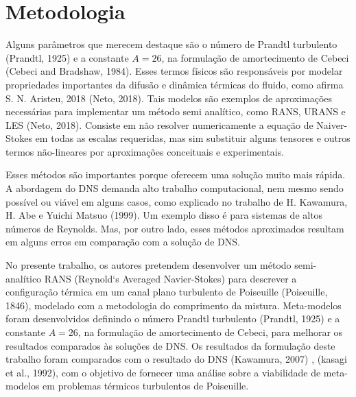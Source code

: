	
\newpage
	

 \section{Metodologia}
 Alguns parâmetros que merecem destaque são o número de Prandtl turbulento (Prandtl, 1925) e a constante $ A = 26 $, na formulação de amortecimento de Cebeci (Cebeci and Bradshaw, 1984). Esses termos físicos são responsáveis por modelar propriedades importantes da difusão e dinâmica térmicas do fluido, como afirma S. N. Aristeu, 2018 (Neto, 2018). Tais modelos são exemplos de aproximações necessárias para implementar um método semi analítico, como RANS, URANS e LES (Neto, 2018). Consiste em não resolver numericamente a equação de Naiver-Stokes em todas as escalas requeridas, mas sim substituir alguns tensores e outros termos não-lineares por aproximações conceituais e experimentais.
 
 Esses métodos são importantes porque oferecem uma solução muito mais rápida. A abordagem do DNS demanda alto trabalho computacional, nem mesmo sendo possível ou viável em alguns casos, como explicado no trabalho de H. Kawamura, H. Abe e Yuichi Matsuo (1999). Um exemplo disso é para sistemas de altos números de Reynolds. Mas, por outro lado, esses métodos aproximados resultam em alguns erros em comparação com a solução de DNS. 
 
 No presente trabalho, os autores pretendem desenvolver um método semi-analítico RANS (Reynold`s Averaged Navier-Stokes) para descrever a configuração térmica em um canal plano turbulento de Poiseuille (Poiseuille, 1846), modelado com a metodologia do comprimento da mistura. Meta-modelos foram desenvolvidos definindo o número Prandtl turbulento (Prandtl, 1925) e a constante $ A = 26 $, na formulação de amortecimento de Cebeci, para melhorar os resultados comparados às soluções de DNS. Os resultados da formulação deste trabalho foram comparados com o resultado do DNS (Kawamura, 2007) , (kasagi et al., 1992), com o objetivo de fornecer uma análise sobre a viabilidade de meta-modelos em problemas térmicos turbulentos de Poiseuille. \\

